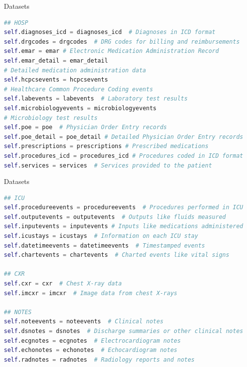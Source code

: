\documentclass{sintefbeamer}
\theoremstyle{definition}
\begin{document}
\begin{frame}[fragile]{Datasets}

\begin{lstlisting}[language=Python]
## HOSP
self.diagnoses_icd = diagnoses_icd  # Diagnoses in ICD format
self.drgcodes = drgcodes  # DRG codes for billing and reimbursements
self.emar = emar # Electronic Medication Administration Record
self.emar_detail = emar_detail 
# Detailed medication administration data
self.hcpcsevents = hcpcsevents 
# Healthcare Common Procedure Coding events
self.labevents = labevents  # Laboratory test results
self.microbiologyevents = microbiologyevents 
# Microbiology test results
self.poe = poe  # Physician Order Entry records
self.poe_detail = poe_detail # Detailed Physician Order Entry records
self.prescriptions = prescriptions # Prescribed medications
self.procedures_icd = procedures_icd # Procedures coded in ICD format
self.services = services  # Services provided to the patient 
\end{lstlisting}
\end{frame}

\begin{frame}[fragile]{Datasets}

\begin{lstlisting}[language=Python]
## ICU
self.procedureevents = procedureevents  # Procedures performed in ICU
self.outputevents = outputevents  # Outputs like fluids measured
self.inputevents = inputevents # Inputs like medications administered
self.icustays = icustays  # Information on each ICU stay
self.datetimeevents = datetimeevents  # Timestamped events
self.chartevents = chartevents  # Charted events like vital signs

## CXR
self.cxr = cxr  # Chest X-ray data
self.imcxr = imcxr  # Image data from chest X-rays

## NOTES
self.noteevents = noteevents  # Clinical notes
self.dsnotes = dsnotes  # Discharge summaries or other clinical notes
self.ecgnotes = ecgnotes  # Electrocardiogram notes
self.echonotes = echonotes  # Echocardiogram notes
self.radnotes = radnotes  # Radiology reports and notes
        
\end{lstlisting}
\end{frame}
\end{document}
